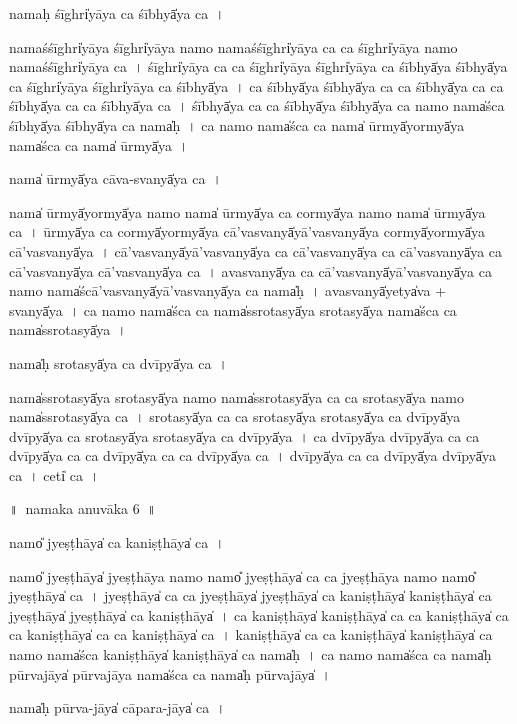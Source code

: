 \documentclass[parskip, DIV=14]{scrartcl}
\begin{document}
{nama॒ḥ śīghri̍yāya ca॒ śībhyā̍ya ca~। 

nama॒śśīghri̍yāya॒ śīghri̍yāya॒  namo॒ nama॒śśīghri̍yāya ca ca॒ śīghri̍yāya॒  namo॒ nama॒śśīghri̍yāya ca~।
śīghri̍yāya ca ca॒  śīghri̍yāya॒ śīghri̍yāya ca॒ śībhyā̍ya॒ śībhyā̍ya ca॒  śīghri̍yāya॒ śīghri̍yāya ca॒ śībhyā̍ya~।
ca॒ śībhyā̍ya॒ śībhyā̍ya ca ca॒ śībhyā̍ya ca ca॒ śībhyā̍ya ca ca॒ śībhyā̍ya ca~।
śībhyā̍ya ca ca॒ śībhyā̍ya॒ śībhyā̍ya ca॒ namo॒ nama̍śca॒ śībhyā̍ya॒ śībhyā̍ya ca॒ nama̍ḥ~।
ca॒ namo॒ nama̍śca ca॒ nama̍ ū॒rmyā̍yo॒rmyā̍ya॒ nama̍śca ca॒ nama̍ ū॒rmyā̍ya~।

nama̍ ū॒rmyā̍ya cāva-sva॒nyā̍ya ca॒~।

nama̍ ū॒rmyā̍yo॒rmyā̍ya॒ namo॒ nama̍ ū॒rmyā̍ya ca co॒rmyā̍ya॒ namo॒ nama̍ ū॒rmyā̍ya ca~।
ū॒rmyā̍ya ca co॒rmyā̍yo॒rmyā̍ya cā'vasva॒nyā̍yā'vasva॒nyā̍ya co॒rmyā̍yo॒rmyā̍ya cā'vasva॒nyā̍ya~।
cā॒'va॒sva॒nyā̍yā'vasva॒nyā̍ya ca cā'vasva॒nyā̍ya ca cā'vasva॒nyā̍ya ca cā'vasva॒nyā̍ya cā'vasva॒nyā̍ya ca~।
a॒va॒sva॒nyā̍ya ca cā'vasva॒nyā̍yā'vasva॒nyā̍ya ca॒ namo॒ nama̍ścā'vasva॒nyā̍yā'vasva॒nyā̍ya ca॒ nama̍ḥ~।
a॒va॒sva॒nyā̍yetya̍va + sva॒nyā̍ya~।
ca॒ namo॒ nama̍śca ca॒ nama̍ssrota॒syā̍ya srota॒syā̍ya॒ nama̍śca ca॒ nama̍ssrota॒syā̍ya~।

nama̍ḥ srota॒syā̍ya ca॒ dvīpyā̍ya ca~।

nama̍ssrota॒syā̍ya srota॒syā̍ya॒ namo॒ nama̍ssrota॒syā̍ya ca ca srota॒syā̍ya॒ namo॒ nama̍ssrota॒syā̍ya ca~।
sro॒ta॒syā̍ya ca ca srota॒syā̍ya srota॒syā̍ya ca॒ dvīpyā̍ya॒ dvīpyā̍ya ca srota॒syā̍ya srota॒syā̍ya ca॒ dvīpyā̍ya~।
ca॒ dvīpyā̍ya॒ dvīpyā̍ya ca ca॒ dvīpyā̍ya ca ca॒ dvīpyā̍ya ca ca॒ dvīpyā̍ya ca~।
dvīpyā̍ya ca ca॒ dvīpyā̍ya॒ dvīpyā̍ya ca~।
ceti̍ ca~।

\newpage
\LARGE
॥~namaka anuvāka 6~॥ 
\Large

namo̎ jye॒ṣṭhāya̍ ca kani॒ṣṭhāya̍ ca॒~।

namo̎ jye॒ṣṭhāya̍ jye॒ṣṭhāya॒  namo॒ namo̎ jye॒ṣṭhāya̍ ca ca jye॒ṣṭhāya॒  namo॒ namo̎ jye॒ṣṭhāya̍ ca~।
jye॒ṣṭhāya̍ ca ca jye॒ṣṭhāya̍ jye॒ṣṭhāya̍ ca kani॒ṣṭhāya̍ kani॒ṣṭhāya̍ ca jye॒ṣṭhāya̍ jye॒ṣṭhāya̍ ca kani॒ṣṭhāya̍~।
ca॒ ka॒ni॒ṣṭhāya̍ kani॒ṣṭhāya̍ ca ca kani॒ṣṭhāya̍ ca ca kani॒ṣṭhāya̍ ca ca kani॒ṣṭhāya̍ ca~।
ka॒ni॒ṣṭhāya̍ ca॒ ca kani॒ṣṭhāya̍ kani॒ṣṭhāya̍ ca॒ namo॒ nama̍śca kani॒ṣṭhāya̍ kani॒ṣṭhāya̍ ca॒ nama̍ḥ~।
ca॒ namo॒ nama̍śca ca॒ nama̍ḥ pūrva॒jāya̍ pūrva॒jāya॒ nama̍śca ca॒ nama̍ḥ pūrva॒jāya̍~।

nama̍ḥ pūrva॒-jāya̍ cāpara॒-jāya̍ ca॒~।

}
\end{document}
